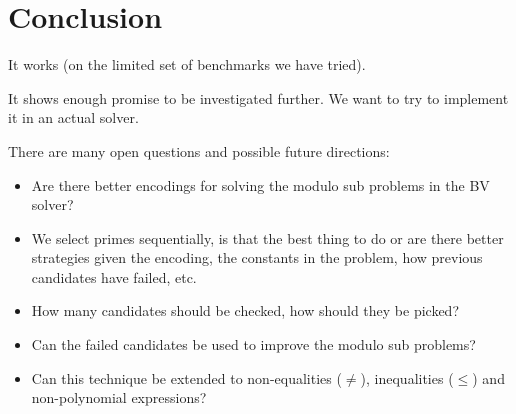 \section{Conclusion}
\label{section:conclusion}


It works (on the limited set of benchmarks we have tried).

It shows enough promise to be investigated further.
We want to try to implement it in an actual solver.

There are many open questions and possible future directions:
\begin{itemize}
\item{Are there better encodings for solving the modulo sub problems in the BV solver?}
\item{We select primes sequentially, is that the best thing to do or are there better strategies given the encoding, the constants in the problem, how previous candidates have failed, etc.}
\item{How many candidates should be checked, how should they be picked?}
\item{Can the failed candidates be used to improve the modulo sub problems?}
\item{Can this technique be extended to non-equalities ($\not=$), inequalities ($\leq$) and non-polynomial expressions?}
\end{itemize}
